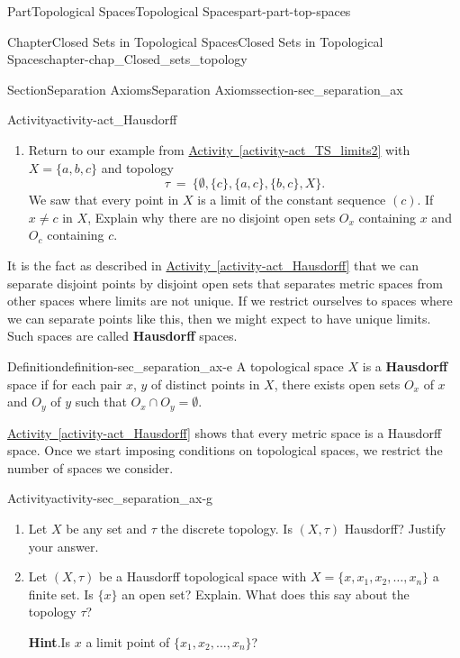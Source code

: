 \documentclass[oneside,10pt,]{book}
\newcommand{\blocktitlefont}{\relax}
\newcommand{\xreffont}{\relax}
\newcommand{\terminology}[1]{\textbf{#1}}
\numberwithin{equation}{chapter}
\begin{document}
\begin{partptx}{Part}{Topological Spaces}{}{Topological Spaces}{}{}{part-part-top-spaces}
\begin{chapterptx}{Chapter}{Closed Sets in Topological Spaces}{}{Closed Sets in Topological Spaces}{}{}{chapter-chap_Closed_sets_topology}
\begin{sectionptx}{Section}{Separation Axioms}{}{Separation Axioms}{}{}{section-sec_separation_ax}
\begin{activity}{Activity}{}{activity-act_Hausdorff}
\begin{enumerate}[font=\bfseries,label=(\alph*),ref=\alph*]
\item{}Return to our example from \hyperref[activity-act_TS_limits2]{Activity~{\xreffont\ref{activity-act_TS_limits2}}} with \(X = \{a, b, c\}\) and topology%
\begin{equation*}
\tau~=~\{\emptyset, \{c\}, \{a, c\}, \{b, c\}, X\}\text{.}
\end{equation*}
We saw that every point in \(X\) is a limit of the constant sequence \((c)\). If \(x \neq c\) in \(X\), Explain why there are no disjoint open sets \(O_x\) containing \(x\) and \(O_c\) containing \(c\).%
\end{enumerate}%
\end{activity}%
It is the fact as described in \hyperref[activity-act_Hausdorff]{Activity~{\xreffont\ref{activity-act_Hausdorff}}} that we can separate disjoint points by disjoint open sets that separates metric spaces from other spaces where limits are not unique. If we restrict ourselves to spaces where we can separate points like this, then we might expect to have unique limits. Such spaces are called \terminology{Hausdorff} spaces.%
\begin{definition}{Definition}{}{definition-sec_separation_ax-e}%
%
A topological space \(X\) is a \terminology{Hausdorff} space if for each pair \(x\), \(y\) of distinct points in \(X\), there exists open sets \(O_x\) of \(x\) and \(O_y\) of \(y\) such that \(O_x \cap O_y = \emptyset\).%
\end{definition}
\hyperref[activity-act_Hausdorff]{Activity~{\xreffont\ref{activity-act_Hausdorff}}} shows that every metric space is a Hausdorff space. Once we start imposing conditions on topological spaces, we restrict the number of spaces we consider.%
\begin{activity}{Activity}{}{activity-sec_separation_ax-g}%
\begin{enumerate}[font=\bfseries,label=(\alph*),ref=\alph*]%
\item{}Let \(X\) be any set and \(\tau\) the discrete topology. Is \((X, \tau)\) Hausdorff? Justify your answer.%
\item{}Let \((X, \tau)\) be a Hausdorff topological space with \(X = \{x, x_1, x_2, \ldots,
x_n\}\) a finite set. Is \(\{x\}\) an open set? Explain. What does this say about the topology \(\tau\)?%
\par\smallskip%
\noindent\textbf{\blocktitlefont Hint}.\hypertarget{hint-sec_separation_ax-g-b-b}{}\quad{}Is \(x\) a limit point of \(\{x_1, x_2, \ldots, x_n\}\)?%
\end{enumerate}%

\end{activity}
\end{sectionptx}
\end{chapterptx}
\end{partptx}
\end{document}
